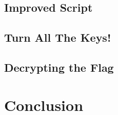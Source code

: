 \documentclass[11pt]{article}
\begin{document}
    \subsection{Improved Script}\label{subsec:improved-script}

    \subsection{Turn All The Keys!}\label{subsec:turn-all-the-keys}

    \subsection{Decrypting the Flag}\label{subsec:decrypting-the-flag}





    \section{Conclusion}\label{sec:conclusion}
\end{document}

